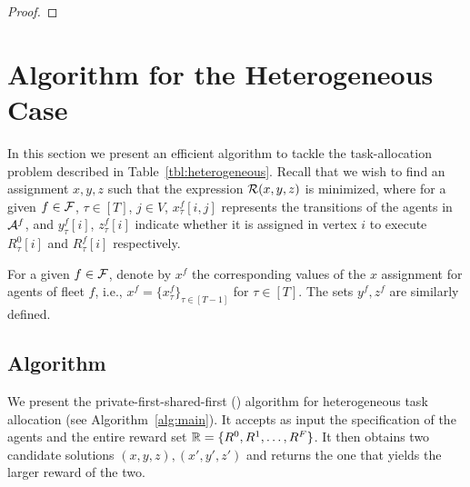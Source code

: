 \documentclass[conference]{IEEEtran}
\begin{document}
\begin{proof}
%
\end{proof}

\section{Algorithm for the Heterogeneous Case}\label{sec:centralized}
In this section we present an efficient algorithm to tackle the task-allocation problem described in Table~\ref{tbl:heterogeneous}. %
Recall that we wish to find an assignment $x,y,z$ such that the expression $\mathcal{R}(x,y,z)$ is minimized, where for a given $f\in \mathcal{F}$, $\tau \in [T]$, $j\in V$, $x_{\tau}^f[i,j]$ represents the transitions of the agents in $\mathcal{A}^f$, and $y_{\tau}^f[i]$, $z_{\tau}^f[i]$ indicate whether it is assigned in vertex $i$ to execute $R_{\tau}^0[i]$ and $R_{\tau}^f[i]$ respectively. 

For a given $f\in \mathcal{F}$, denote by $x^f$ the corresponding values of the $x$ assignment for agents of fleet $f$, i.e., $x^f=\{x^f_{\tau}\}_{\tau\in [T-1]}$ for $\tau \in [T]$. The sets $y^f,z^f$ are similarly defined. 

\subsection{Algorithm}
We present the private-first-shared-first (\alg) algorithm for heterogeneous task allocation (see  Algorithm~\ref{alg:main}). It accepts as input the specification of the agents and the entire reward set $\mathbb{R}=\{R^0,R^1,\ldots,R^F\}$. It then obtains two candidate solutions $(x,y,z),(x',y',z')$ and returns the one that yields the larger reward of the two. 
\end{document}

